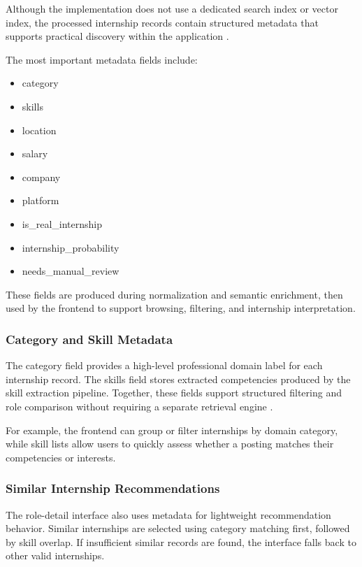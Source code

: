 Although the implementation does not use a dedicated search index or vector index, the processed internship records contain structured metadata that supports practical discovery within the application \cite{manning2008introduction, doan2012principles}.

The most important metadata fields include:
\begin{itemize}[leftmargin=1.4em,itemsep=0.25em,topsep=0.25em]
\item category
\item skills
\item location
\item salary
\item company
\item platform
\item is\_real\_internship
\item internship\_probability
\item needs\_manual\_review
\end{itemize}
These fields are produced during normalization and semantic enrichment, then used by the frontend to support browsing, filtering, and internship interpretation.

\subsubsection*{Category and Skill Metadata}

The category field provides a high-level professional domain label for each internship record. The skills field stores extracted competencies produced by the skill extraction pipeline. Together, these fields support structured filtering and role comparison without requiring a separate retrieval engine \cite{esco2024, pappas2022jobbert}.

For example, the frontend can group or filter internships by domain category, while skill lists allow users to quickly assess whether a posting matches their competencies or interests.

\subsubsection*{Similar Internship Recommendations}

The role-detail interface also uses metadata for lightweight recommendation behavior. Similar internships are selected using category matching first, followed by skill overlap. If insufficient similar records are found, the interface falls back to other valid internships.

